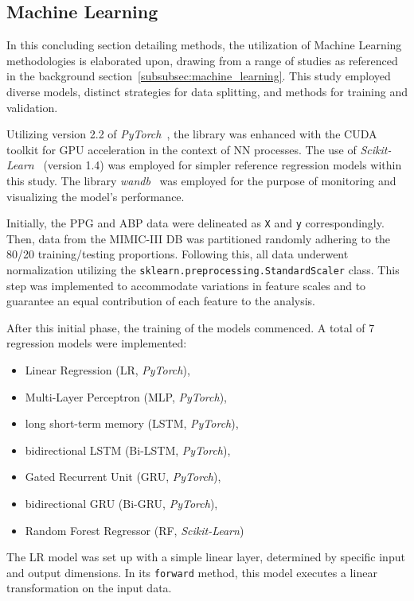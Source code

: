 \subsection{Machine Learning}
\label{subsec:ml_methods}

In this concluding section detailing methods, the utilization of Machine Learning methodologies is elaborated upon,
drawing from a range of studies as referenced in the background section~\ref{subsubsec:machine_learning}.
This study employed diverse models, distinct strategies for data splitting, and methods for training and validation.

Utilizing version 2.2 of \textit{PyTorch}~\cite{PyTorch}, the library was enhanced with the CUDA toolkit for GPU acceleration in the context of NN processes.
The use of \textit{Scikit-Learn}~\cite{ScikitlearnMachineLearning} (version 1.4) was employed for simpler reference regression models within this study.
The library \textit{wandb}~\cite{Wandb} was employed for the purpose of monitoring and visualizing the model's performance.

Initially, the PPG and ABP data were delineated as \texttt{X} and \texttt{y} correspondingly.
Then, data from the MIMIC-III DB was partitioned randomly adhering to the 80/20 training/testing proportions.
Following this, all data underwent normalization utilizing the \texttt{sklearn.preprocessing.StandardScaler} class.
This step was implemented to accommodate variations in feature scales and to guarantee an equal contribution of each feature to the analysis.

After this initial phase, the training of the models commenced.
A total of 7 regression models were implemented:
\begin{itemize}
    \item Linear Regression (LR, \textit{PyTorch}),
    \item Multi-Layer Perceptron (MLP, \textit{PyTorch}),
    \item long short-term memory (LSTM, \textit{PyTorch}),
    \item bidirectional LSTM (Bi-LSTM, \textit{PyTorch}),
    \item Gated Recurrent Unit (GRU, \textit{PyTorch}),
    \item bidirectional GRU (Bi-GRU, \textit{PyTorch}),
    \item Random Forest Regressor (RF, \textit{Scikit-Learn})
\end{itemize}

The LR model was set up with a simple linear layer, determined by specific input and output dimensions.
In its \texttt{forward} method, this model executes a linear transformation on the input data.

